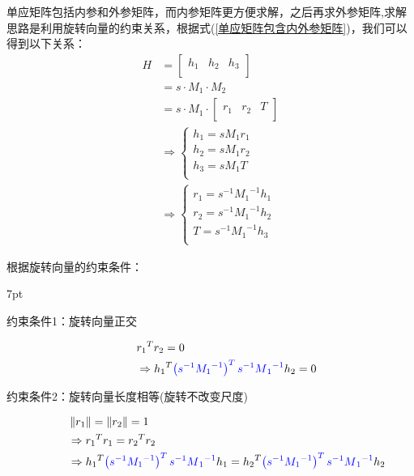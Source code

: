\documentclass{article}
\newenvironment{formal}{%
	\def\FrameCommand{%
		\hspace{1pt}%
		{\color{DarkBlue}\vrule width 2pt}%
		{\color{formalshade}\vrule width 4pt}%
		\colorbox{formalshade}%
	}%
	\MakeFramed{\advance\hsize-\width\FrameRestore}%
	\noindent\hspace{-4.55pt}%
	\begin{adjustwidth}{}{7pt}%
		\vspace{2pt}\vspace{2pt}%
	}	{%
		\vspace{2pt}\end{adjustwidth}\endMakeFramed%
}
\begin{document}
\begin{itemize}
	单应矩阵包括内参和外参矩阵，而内参矩阵更方便求解，之后再求外参矩阵,求解思路是利用旋转向量的约束关系，根据式(\ref{单应矩阵包含内外参矩阵})，我们可以得到以下关系：\\
	\begin{align}
		H &=\left[ \begin{matrix}
			h_1&		h_2&		h_3\\
		\end{matrix} \right] \nonumber
		\\
		&=s \cdot M_1\cdot M_2 \nonumber
		\\
		&=s \cdot M_1\cdot \left[ \begin{matrix}
			r_1&		r_2&		T\\
		\end{matrix} \right] \nonumber
		\\
		&	\Rightarrow \begin{cases}
			h_1=sM_1r_1\\
			h_2=sM_1r_2\\
			h_3=sM_1T\\
		\end{cases} \nonumber
		\\
		&	\Rightarrow \begin{cases}
			r_1=s ^{-1} {M_1}^{-1}h_1\\
			r_2=s ^{-1} {M_1}^{-1}h_2\\
			T=s ^{-1} {M_1}^{-1}h_3\\
		\end{cases}
	\end{align}

根据旋转向量的约束条件：
\begin{formal}
\begin{description}
	\item[约束条件1：旋转向量正交] 
	\begin{align}
		& {r_1}^Tr_2=0 \nonumber
		\\
		& \Rightarrow {h_1}^T{\color{blue} \left( s ^{-1} {M_1}^{-1} \right) ^Ts ^{-1} {M{\color{blue} _1}}^{-1}}h_2=0 \label{内参矩阵的求解约束条件1}
	\end{align}
	\item[约束条件2：旋转向量长度相等(旋转不改变尺度)] 
	\begin{align}
		& \left\| r_1 \right\| =\left\| r_2 \right\| =1 \nonumber
		\\
		& \Rightarrow {r_1}^Tr_1={r_2}^Tr_2 \nonumber
		\\
		& \Rightarrow {h_1}^T{\color{blue} \left( s ^{-1}{M_1}^{-1} \right) ^Ts ^{-1}{M{\color{blue} _1}}^{-1}}h_1={h_2}^T{\color{blue} \left( s ^{-1}{M_1}^{-1} \right) ^Ts ^{-1}{M{\color{blue} _1}}^{-1}}h_2 \label{内参矩阵的求解约束条件2}
	\end{align}
\end{description}
\end{formal}


\end{itemize}
\end{document}
